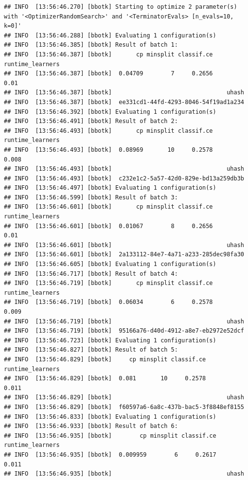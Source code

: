 \documentclass[
]{scrbook}
\begin{document}
\begin{verbatim}
## INFO  [13:56:46.270] [bbotk] Starting to optimize 2 parameter(s) with '<OptimizerRandomSearch>' and '<TerminatorEvals> [n_evals=10, k=0]' 
## INFO  [13:56:46.288] [bbotk] Evaluating 1 configuration(s) 
## INFO  [13:56:46.385] [bbotk] Result of batch 1: 
## INFO  [13:56:46.387] [bbotk]       cp minsplit classif.ce runtime_learners 
## INFO  [13:56:46.387] [bbotk]  0.04709        7     0.2656             0.01 
## INFO  [13:56:46.387] [bbotk]                                 uhash 
## INFO  [13:56:46.387] [bbotk]  ee331cd1-44fd-4293-8046-54f19ad1a234 
## INFO  [13:56:46.392] [bbotk] Evaluating 1 configuration(s) 
## INFO  [13:56:46.491] [bbotk] Result of batch 2: 
## INFO  [13:56:46.493] [bbotk]       cp minsplit classif.ce runtime_learners 
## INFO  [13:56:46.493] [bbotk]  0.08969       10     0.2578            0.008 
## INFO  [13:56:46.493] [bbotk]                                 uhash 
## INFO  [13:56:46.493] [bbotk]  c232e1c2-5a57-42d0-829e-bd13a259db3b 
## INFO  [13:56:46.497] [bbotk] Evaluating 1 configuration(s) 
## INFO  [13:56:46.599] [bbotk] Result of batch 3: 
## INFO  [13:56:46.601] [bbotk]       cp minsplit classif.ce runtime_learners 
## INFO  [13:56:46.601] [bbotk]  0.01067        8     0.2656             0.01 
## INFO  [13:56:46.601] [bbotk]                                 uhash 
## INFO  [13:56:46.601] [bbotk]  2a133112-84e7-4a71-a233-285dec98fa30 
## INFO  [13:56:46.605] [bbotk] Evaluating 1 configuration(s) 
## INFO  [13:56:46.717] [bbotk] Result of batch 4: 
## INFO  [13:56:46.719] [bbotk]       cp minsplit classif.ce runtime_learners 
## INFO  [13:56:46.719] [bbotk]  0.06034        6     0.2578            0.009 
## INFO  [13:56:46.719] [bbotk]                                 uhash 
## INFO  [13:56:46.719] [bbotk]  95166a76-d40d-4912-a8e7-eb2972e52dcf 
## INFO  [13:56:46.723] [bbotk] Evaluating 1 configuration(s) 
## INFO  [13:56:46.827] [bbotk] Result of batch 5: 
## INFO  [13:56:46.829] [bbotk]     cp minsplit classif.ce runtime_learners 
## INFO  [13:56:46.829] [bbotk]  0.081       10     0.2578            0.011 
## INFO  [13:56:46.829] [bbotk]                                 uhash 
## INFO  [13:56:46.829] [bbotk]  f60597a6-6a8c-437b-bac5-3f8848ef8155 
## INFO  [13:56:46.833] [bbotk] Evaluating 1 configuration(s) 
## INFO  [13:56:46.933] [bbotk] Result of batch 6: 
## INFO  [13:56:46.935] [bbotk]        cp minsplit classif.ce runtime_learners 
## INFO  [13:56:46.935] [bbotk]  0.009959        6     0.2617            0.011 
## INFO  [13:56:46.935] [bbotk]                                 uhash 

\end{verbatim}
\end{document}
